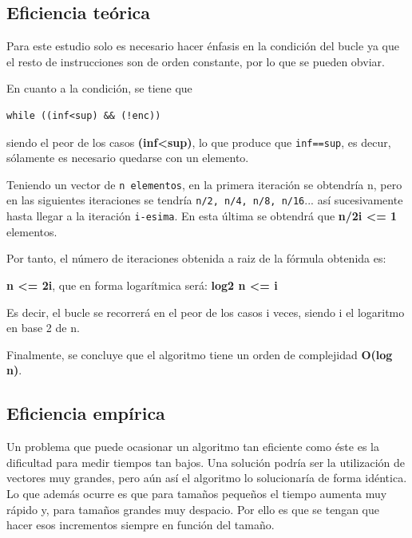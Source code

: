 \subsection{Eficiencia teórica}
Para este estudio solo es necesario hacer énfasis en la condición del bucle ya que
el resto de instrucciones son de orden constante, por lo que se pueden obviar. 

En cuanto a la condición, se tiene que 
\begin {verbatim}
while ((inf<sup) && (!enc))
\end{verbatim}
siendo el peor de los casos \textbf{(inf<sup)}, lo que produce que \texttt{inf==sup}, es decur, sólamente es necesario quedarse con un elemento. 

Teniendo un vector de \texttt{n elementos}, en la primera iteración se obtendría n, pero en las siguientes iteraciones se tendría \texttt{n/2, n/4, n/8, n/16}... así sucesivamente hasta llegar
a la iteración \texttt{i-esima}. En esta última se obtendrá que \textbf{n/2i <= 1} elementos. 

Por tanto, el número de iteraciones obtenida a raiz de la fórmula obtenida es:

\begin{center}\textbf{n <= 2i}, que en forma logarítmica será:
\textbf{log2 n <= i}\end{center}

Es decir, el bucle se recorrerá en el peor de los casos i veces, siendo i el logaritmo en base 2 de n. 

Finalmente, se concluye que el algoritmo tiene un orden de complejidad \textbf{O(log n)}.

\subsection{Eficiencia empírica}
Un problema que puede ocasionar un algoritmo tan eficiente como éste es la dificultad para medir tiempos tan bajos. Una solución podría ser la utilización de vectores muy grandes, pero aún así el algoritmo lo solucionaría de forma idéntica. Lo que además ocurre es que para tamaños pequeños el tiempo aumenta muy rápido y, para tamaños grandes muy despacio. Por ello es que se tengan que hacer esos incrementos siempre en función del tamaño.

